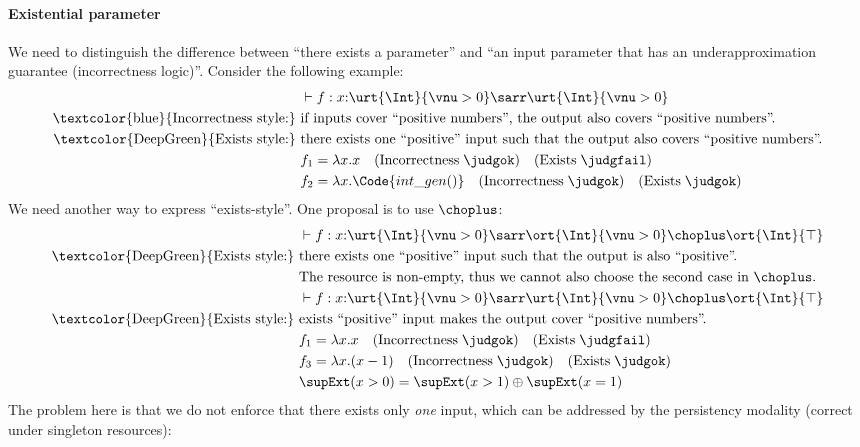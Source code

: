 \paragraph{Existential parameter} We need to distinguish the difference between ``there exists a parameter'' and ``an input parameter that has an underapproximation guarantee (incorrectness logic)''. Consider the following example:
\begin{align*}
  &\vdash f : x{:}\urt{\Int}{\vnu > 0} \sarr \urt{\Int}{\vnu > 0}
  \\\text{\textcolor{blue}{Incorrectness style:} }& \text{if inputs cover ``positive numbers'', the output also covers ``positive numbers''.}
  \\\text{\textcolor{DeepGreen}{Exists style:} }& \text{there exists one ``positive'' input such that the output also covers ``positive numbers''.}
  \\& f_1 = \lambda x.x \quad (\text{Incorrectness}\; \judgok) \quad (\text{Exists}\; \judgfail)
  \\& f_2 = \lambda x.\Code{int\_gen()} \quad (\text{Incorrectness}\; \judgok) \quad (\text{Exists}\; \judgok)
\end{align*} 
We need another way to express ``exists-style''. One proposal is to use $\choplus$:
\begin{align*}
  &\vdash f : x{:}\urt{\Int}{\vnu > 0} \sarr \ort{\Int}{\vnu > 0} \choplus \ort{\Int}{\top} 
  \\\text{\textcolor{DeepGreen}{Exists style:} }& \text{there exists one ``positive'' input such that the output is also ``positive''.}
  \\& \text{The resource is non-empty, thus we cannot also choose the second case in $\choplus$.}
  \\&\vdash f : x{:}\urt{\Int}{\vnu > 0} \sarr \urt{\Int}{\vnu > 0} \choplus \ort{\Int}{\top} 
  \\\text{\textcolor{DeepGreen}{Exists style:} }& \text{exists ``positive'' input makes the output cover ``positive numbers''.}
  \\& f_1 = \lambda x.x \quad (\text{Incorrectness}\; \judgok) \quad (\text{Exists}\; \judgfail)
  \\& f_3 = \lambda x.(x - 1) \quad (\text{Incorrectness}\; \judgok) \quad (\text{Exists}\; \judgok)
  \\& \supExt(x > 0) = \supExt(x > 1) \oplus \supExt(x = 1)  
\end{align*} 
The problem here is that we do not enforce that there exists only \emph{one} input, which can be addressed by the persistency modality (correct under singleton resources):
